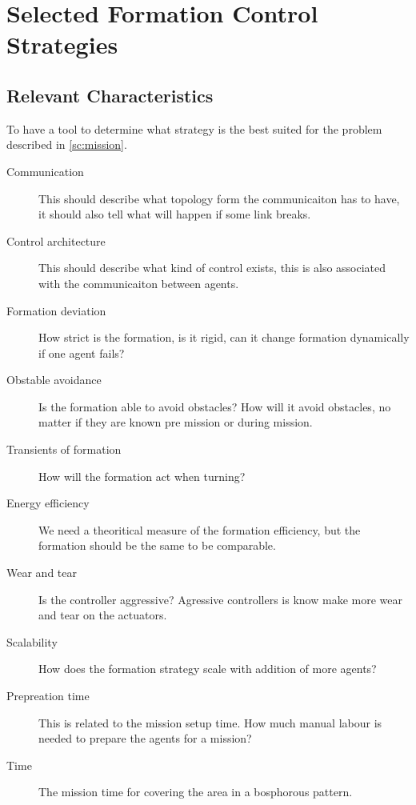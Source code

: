 \chapter{Selected Formation Control Strategies}
\label{ch:selformctrl}


\section{Relevant Characteristics}
To have a tool to determine what strategy is the best suited for the problem described in \vref{sc:mission}.

\begin{description}
\item[Communication] This should describe what topology form the communicaiton has to have, it should also tell what will happen if some link breaks.
\item[Control architecture] This should describe what kind of control exists, this is also associated with the communicaiton between agents.
\item[Formation deviation] How strict is the formation, is it rigid, can it change formation dynamically if one agent fails?
\item[Obstable avoidance] Is the formation able to avoid obstacles? How will it avoid obstacles, no matter if they are known pre mission or during mission.
\item[Transients of formation] How will the formation act when turning?
\item[Energy efficiency] We need a theoritical measure of the formation efficiency, but the formation should be the same to be comparable.
\item[Wear and tear] Is the controller aggressive? Agressive controllers is know make more wear and tear on the actuators.
\item[Scalability] How does the formation strategy scale with addition of more agents?
\item[Prepreation time] This is related to the mission setup time. How much manual labour is needed to prepare the agents for a mission?
\item[Time] The mission time for covering the area in a bosphorous pattern.
\end{description}


